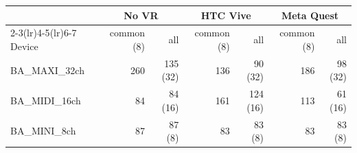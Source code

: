 \begin{tabular}{lrrrrrr}
\toprule
 & \multicolumn{2}{c}{No VR} & \multicolumn{2}{c}{HTC Vive} & \multicolumn{2}{c}{Meta Quest} \\
\cmidrule(lr){2-3}\cmidrule(lr){4-5}\cmidrule(lr){6-7}
Device & common (8) & all & common (8) & all & common (8) & all \\
\midrule
BA\_MAXI\_32ch & 260 & 135 (32) & 136 & 90 (32) & 186 & 98 (32) \\
BA\_MIDI\_16ch & 84 & 84 (16) & 161 & 124 (16) & 113 & 61 (16) \\
BA\_MINI\_8ch & 87 & 87 (8) & 83 & 83 (8) & 83 & 83 (8) \\
\bottomrule
\end{tabular}
